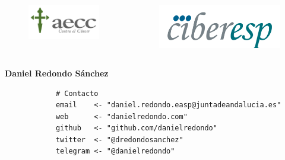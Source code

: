 \documentclass{beamer}
\begin{document}
\begin{frame}[fragile]
\begin{columns}
\begin{column}{0.33\textwidth}
			\begin{figure}
				\centering
				\includegraphics[width=.7\textwidth]{logos/logo_aecc.png}
			\end{figure}
		\end{column}
		\begin{column}{0.33\textwidth}
			\begin{figure}
				\centering
				\includegraphics[width=.7\textwidth]{logos/logo_ciber.png}
			\end{figure}
		\end{column}
	\end{columns}

	\bigskip
	
	\vspace{20pt}
		
	\centering
	\Large
	\textbf{Daniel Redondo Sánchez}
	
	\bigskip


	\normalsize{
		\begin{verbatim}
			# Contacto
			email    <- "daniel.redondo.easp@juntadeandalucia.es"
			web      <- "danielredondo.com"
			github   <- "github.com/danielredondo"
			twitter  <- "@dredondosanchez"
			telegram <- "@danielredondo"
		\end{verbatim}
		
}
\end{frame}
\end{document}
